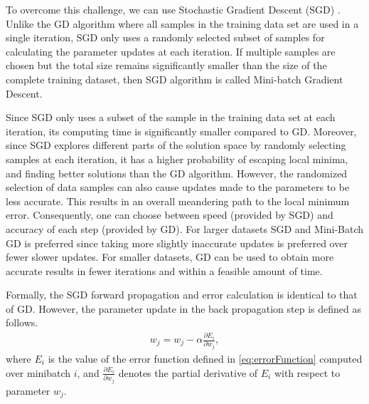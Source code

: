 \documentclass[conference]{IEEEtran}
\begin{document}
To overcome this challenge, we can use Stochastic Gradient Descent (SGD) \cite{bottou2010large}. 
Unlike the GD algorithm where all samples in the training data set are used in a single iteration, SGD only uses a randomly
selected subset of samples for calculating the parameter updates at each iteration. 
If multiple samples are chosen but the total size remains significantly smaller than the size of the complete
training dataset, then SGD algorithm is called Mini-batch Gradient Descent.


Since SGD only uses a subset of the sample in the training data set at each iteration, its computing time is
significantly smaller compared to GD.  Moreover, since SGD explores different parts of the solution space by randomly selecting samples
at each iteration, it has a higher probability of escaping local minima, and finding better solutions than the GD algorithm. 
However, the randomized selection of data samples can also cause updates made to the parameters to be less accurate. This results in an
overall meandering path to the local minimum error. Consequently, one can choose between speed (provided by SGD) and accuracy of each step 
(provided by GD). For larger datasets SGD and Mini-Batch GD is preferred since taking more slightly inaccurate updates is preferred
over fewer slower updates. For smaller datasets, GD can be used to obtain more accurate results in fewer iterations and
within a feasible amount of time. 

Formally, the SGD forward propagation and error calculation is identical to that of GD. However, the parameter update in the 
back propagation step is defined as follows.
\begin{align}\label{eq:SGD}
w_j = w_j -\alpha \frac{\partial E_i}{\partial w_j}, 
\end{align}
where $E_i$ is the value of the error function defined in \ref{eq:errorFunction} computed over
minibatch $i$, and  $\frac{\partial E_i}{\partial w_j}$ denotes the partial derivative of $E_i$ with respect to parameter $w_j$. 
 
\end{document}
